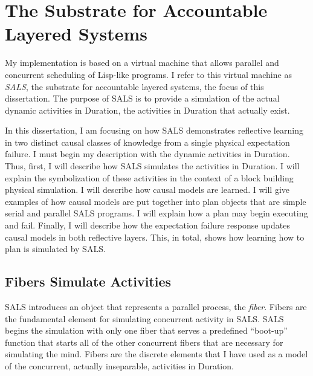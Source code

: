 \chapter{The Substrate for Accountable Layered Systems}
\label{chapter:the_substrate_for_accountable_layered_systems}


My implementation is based on a virtual machine that allows parallel
and concurrent scheduling of Lisp-like programs.  I refer to this
virtual machine as \emph{SALS}, the substrate for accountable layered
systems, the focus of this dissertation.  The purpose of SALS is to
provide a simulation of the actual dynamic activities in Duration, the
activities in Duration that actually exist.


In this dissertation, I am focusing on how SALS demonstrates
reflective learning in two distinct causal classes of knowledge from a
single physical expectation failure.  I must begin my description with
the dynamic activities in Duration.  Thus, first, I will describe how
SALS simulates the activities in Duration.  I will explain the
symbolization of these activities in the context of a block building
physical simulation.  I will describe how causal models are learned.
I will give examples of how causal models are put together into plan
objects that are simple serial and parallel SALS programs.  I will
explain how a plan may begin executing and fail.  Finally, I will
describe how the expectation failure response updates causal models in
both reflective layers.  This, in total, shows how learning how to
plan is simulated by SALS.

\section{Fibers Simulate Activities}

SALS introduces an object that represents a parallel process, the
\emph{fiber}.  Fibers are the fundamental element for simulating
concurrent activity in SALS.  SALS begins the simulation with only
one fiber that serves a predefined ``boot-up'' function that starts
all of the other concurrent fibers that are necessary for simulating
the mind.  Fibers are the discrete elements that I have used as a
model of the concurrent, actually inseparable, activities in Duration.

